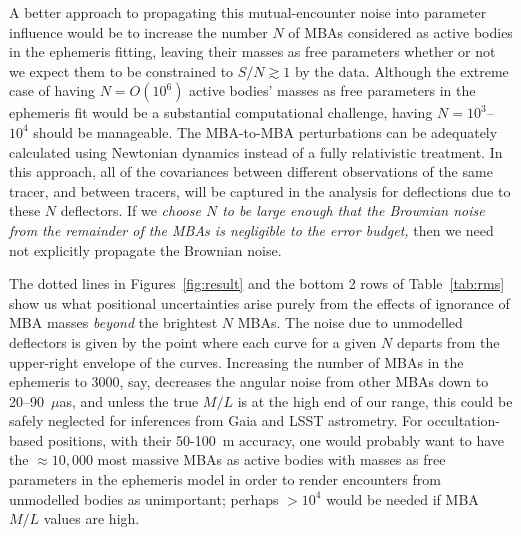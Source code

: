 \documentclass[linenumbers, onecolumn]{aastex631}
\newcommand\edited[1]{{\color{red} {#1}}}
\newcommand{\uas}{$\mu$as}
\begin{document}
A better approach \edited{to propagating this mutual-encounter noise into parameter influence would be} to increase the number
$N$ of MBAs considered as active bodies in the ephemeris fitting,
leaving their masses as free parameters whether or not we expect them
to be constrained to $S/N\gtrsim1$ by the data.  Although the extreme
case of having $N=O(10^6)$ active bodies' masses as free parameters in
the ephemeris fit would be a substantial computational challenge,
having $N=10^3$--$10^4$ should be manageable.  The MBA-to-MBA perturbations can
be adequately calculated using Newtonian dynamics instead of a fully
relativistic treatment.  In this approach, all of the covariances between
different observations of the same tracer, and between tracers, will be captured
in the analysis for deflections due to these $N$ deflectors.  If we \emph{choose
  $N$ to be large enough that the Brownian noise from the remainder of the MBAs is negligible to the error budget,} then we need not explicitly propagate the Brownian noise.  

\edited{The dotted lines in Figures~\ref{fig:result} and the bottom 2 rows of Table~\ref{tab:rms} show us what positional uncertainties arise purely from the effects of ignorance of MBA masses \emph{beyond} the brightest $N$ MBAs.} The noise due to unmodelled deflectors is given by the point where each curve for a given $N$ departs from the upper-right envelope of the curves.   Increasing the number of MBAs in the ephemeris \edited{to 3000, say, decreases the angular noise from other MBAs down to 20--90~\uas, and unless the true $M/L$ is at the high end of our range, this could be safely neglected for inferences from Gaia and LSST astrometry.
For occultation-based positions, with their 50-100~m accuracy, one would probably want to have the $\approx10,000$ most massive MBAs as active bodies with masses as free parameters in the ephemeris model in order to render encounters from unmodelled bodies as unimportant; perhaps $>10^4$ would be needed if MBA $M/L$ values are high.}
\end{document}
